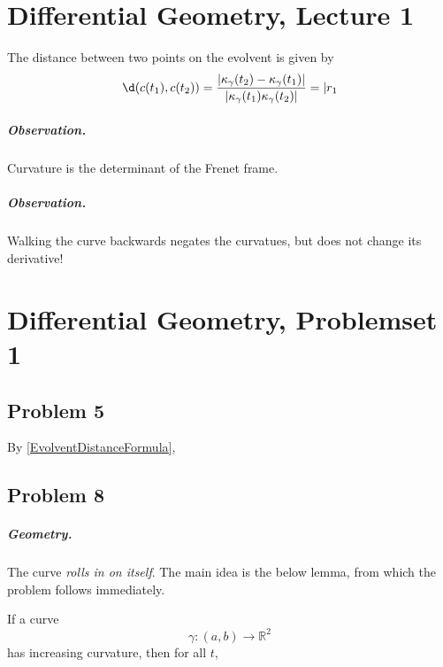 \chapter{Differential Geometry, Lecture 1}

\begin{lemma}\label{DotProductDifferentiation}

\end{lemma}

\begin{lemma}\label{EvolventDistanceFormula}
    The distance between two points on the evolvent is given by
    \[
        \d (c(t_1), c(t_2) ) = \frac{ \lvert \kappa_\gamma(t_2) - \kappa_\gamma(t_1) \rvert}{\lvert \kappa_\gamma(t_1) \kappa_\gamma(t_2) \rvert } = \lvert r_1
    \]
\end{lemma}

\paragraph{Observation.} Curvature is the determinant of the Frenet frame.
\paragraph{Observation.} Walking the curve backwards negates the curvatues, but does not change its derivative!

\chapter{Differential Geometry, Problemset 1}

\section{Problem 5}

By \ref{EvolventDistanceFormula}, 

\section{Problem 8}

\paragraph{Geometry.} The curve \emph{rolls in on itself}.
The main idea is the below lemma, from which the problem follows immediately.
\begin{lemma}\label{IncreasingCurvatureInsideCircle}
    If a curve
    \[ \gamma: (a, b) \to \mathbb{R}^2 \]
    has increasing curvature, then for all \( t \), 
\end{lemma}

